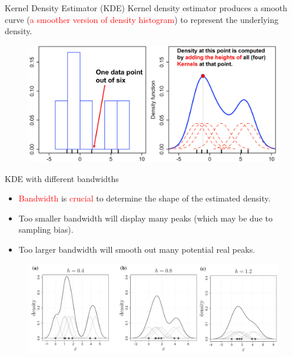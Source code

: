 \documentclass{beamer}
\begin{document}
\begin{frame}{Kernel Density Estimator (KDE)}
Kernel density estimator produces a smooth curve (\textcolor{red}{a smoother version of density histogram}) to represent the underlying density. 
\begin{figure}
\includegraphics[width=0.99\linewidth]{PlotsLec1/KDE}
\end{figure}
\end{frame}

\begin{frame}{KDE with different bandwidths}
\begin{itemize}
\item \textcolor{red}{Bandwidth} is \textcolor{red}{crucial} to determine the shape of the estimated density.
\item Too smaller bandwidth will display many peaks (which may be due to sampling bias).
\item Too larger bandwidth will smooth out many potential real peaks. 
\end{itemize}
\begin{figure}
\includegraphics[width=0.99\linewidth]{PlotsLec1/KernelManyBWs}
\end{figure}
\end{frame}
\end{document}
